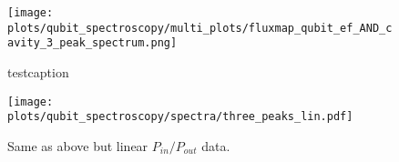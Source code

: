\begin{figure}
\centering
\texttt{[image: plots/qubit\_spectroscopy/multi\_plots/fluxmap\_qubit\_ef\_AND\_cavity\_3\_peak\_spectrum.png]}
\caption{testcaption}
\label{testlabel}
\end{figure}





%
%
%
%


\begin{figure}
\centering
{\texttt{[image: plots/qubit\_spectroscopy/spectra/three\_peaks\_lin.pdf]}}
\caption{
Same as above but linear $P_{in}/P_{out}$ data.
}
\label{fig:cavity_spectroscopy:qubit_ef:main}
\end{figure}



